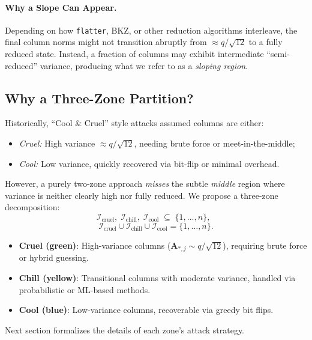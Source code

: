 \documentclass[conference]{IEEEtran}
\begin{document}
\paragraph{Why a Slope Can Appear.}
Depending on how \texttt{flatter}, BKZ, or other reduction algorithms interleave, the final column norms might not transition abruptly from $\approx q/\sqrt{12}$ to a fully reduced state. Instead, a fraction of columns may exhibit intermediate ``semi-reduced'' variance, producing what we refer to as a \emph{sloping region}.

\subsection{Why a Three-Zone Partition?}
\label{subsec:3zone}

Historically, ``Cool \& Cruel'' style attacks assumed columns are either:
\begin{itemize}
    \item \emph{Cruel:} High variance $\approx q/\sqrt{12}$, needing brute force or meet-in-the-middle;
    \item \emph{Cool:} Low variance, quickly recovered via bit-flip or minimal overhead.
\end{itemize}
However, a purely two-zone approach \emph{misses} the subtle \emph{middle} region where variance is neither clearly high nor fully reduced. We propose a three-zone decomposition:
\vspace{-5mm}
\[
  \mathcal{I}_{\mathrm{cruel}},\;
  \mathcal{I}_{\mathrm{chill}},\;
  \mathcal{I}_{\mathrm{cool}}
  \;\subseteq\;\{1,\ldots,n\}, 
  \;\;
\]
\vspace{-8mm}
\[
  \mathcal{I}_{\mathrm{cruel}}\cup\mathcal{I}_{\mathrm{chill}}\cup\mathcal{I}_{\mathrm{cool}}=\{1,\ldots,n\}.
\]

\begin{itemize}
    \item \textbf{Cruel (green)}:  
    High-variance columns (\(\mathbf{A}_{*,j} \sim q/\sqrt{12}\)), requiring brute force or hybrid guessing. 
    \item \textbf{Chill (yellow)}:  
    Transitional columns with moderate variance, handled via probabilistic or ML-based methods.  
    \item \textbf{Cool (blue)}:  
    Low-variance columns, recoverable via greedy bit flips.
\end{itemize}
  

Next section formalizes the details of each zone’s attack strategy.
\end{document}
